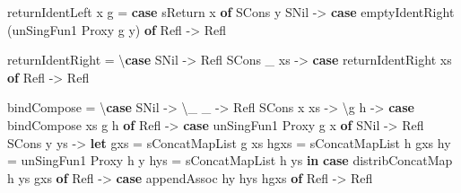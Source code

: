 \documentclass[]{article}
\newenvironment{Shaded}{}{}
\newcommand{\DataTypeTok}[1]{\textcolor[rgb]{0.56,0.13,0.00}{#1}}
\newcommand{\FunctionTok}[1]{\textcolor[rgb]{0.02,0.16,0.49}{#1}}
\newcommand{\KeywordTok}[1]{\textcolor[rgb]{0.00,0.44,0.13}{\textbf{#1}}}
\newcommand{\NormalTok}[1]{#1}
\newcommand{\OtherTok}[1]{\textcolor[rgb]{0.00,0.44,0.13}{#1}}
\begin{document}
\begin{Shaded}
\begin{Highlighting}[]
\NormalTok{    returnIdentLeft x g }\FunctionTok{=} \KeywordTok{case}\NormalTok{ sReturn x }\KeywordTok{of}
      \DataTypeTok{SCons}\NormalTok{ y }\DataTypeTok{SNil} \OtherTok{->} \KeywordTok{case}\NormalTok{ emptyIdentRight (unSingFun1 }\DataTypeTok{Proxy}\NormalTok{ g y) }\KeywordTok{of}
        \DataTypeTok{Refl} \OtherTok{->} \DataTypeTok{Refl}

\NormalTok{    returnIdentRight }\FunctionTok{=}\NormalTok{ \textbackslash{}}\KeywordTok{case}
      \DataTypeTok{SNil}       \OtherTok{->} \DataTypeTok{Refl}
      \DataTypeTok{SCons}\NormalTok{ _ xs }\OtherTok{->} \KeywordTok{case}\NormalTok{ returnIdentRight xs }\KeywordTok{of}
        \DataTypeTok{Refl} \OtherTok{->} \DataTypeTok{Refl}

\NormalTok{    bindCompose }\FunctionTok{=}\NormalTok{ \textbackslash{}}\KeywordTok{case}
      \DataTypeTok{SNil}       \OtherTok{->}\NormalTok{ \textbackslash{}_ _ }\OtherTok{->} \DataTypeTok{Refl}
      \DataTypeTok{SCons}\NormalTok{ x xs }\OtherTok{->}\NormalTok{ \textbackslash{}g h }\OtherTok{->} \KeywordTok{case}\NormalTok{ bindCompose xs g h }\KeywordTok{of}
        \DataTypeTok{Refl} \OtherTok{->} \KeywordTok{case}\NormalTok{ unSingFun1 }\DataTypeTok{Proxy}\NormalTok{ g x }\KeywordTok{of}
          \DataTypeTok{SNil}       \OtherTok{->} \DataTypeTok{Refl}
          \DataTypeTok{SCons}\NormalTok{ y ys }\OtherTok{->}
            \KeywordTok{let}\NormalTok{ gxs  }\FunctionTok{=}\NormalTok{ sConcatMapList g xs}
\NormalTok{                hgxs }\FunctionTok{=}\NormalTok{ sConcatMapList h gxs}
\NormalTok{                hy   }\FunctionTok{=}\NormalTok{ unSingFun1 }\DataTypeTok{Proxy}\NormalTok{ h y}
\NormalTok{                hys  }\FunctionTok{=}\NormalTok{ sConcatMapList h ys}
            \KeywordTok{in}  \KeywordTok{case}\NormalTok{ distribConcatMap h ys gxs }\KeywordTok{of}
                  \DataTypeTok{Refl} \OtherTok{->} \KeywordTok{case}\NormalTok{ appendAssoc hy hys hgxs }\KeywordTok{of}
                    \DataTypeTok{Refl} \OtherTok{->} \DataTypeTok{Refl}


\end{Highlighting}
\end{Shaded}
\end{document}
